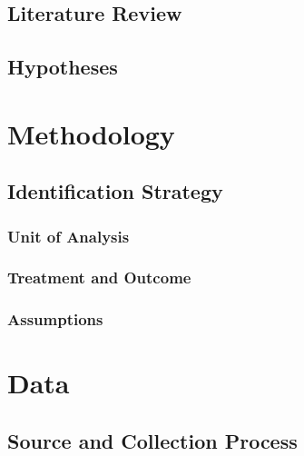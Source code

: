 \documentclass[a4paper,11pt]{article}
\begin{document}
\hypertarget{literature-review}{%
\subsection{Literature Review}\label{literature-review}}

\hypertarget{hypotheses}{%
\subsection{Hypotheses}\label{hypotheses}}

\newpage

\hypertarget{methodology}{%
\section{Methodology}\label{methodology}}

\hypertarget{identification-strategy}{%
\subsection{Identification Strategy}\label{identification-strategy}}

\hypertarget{unit-of-analysis}{%
\subsubsection{Unit of Analysis}\label{unit-of-analysis}}

\hypertarget{treatment-and-outcome}{%
\subsubsection{Treatment and Outcome}\label{treatment-and-outcome}}

\hypertarget{assumptions}{%
\subsubsection{Assumptions}\label{assumptions}}

\newpage

\hypertarget{data}{%
\section{Data}\label{data}}

\hypertarget{source-and-collection-process}{%
\subsection{Source and Collection Process}\label{source-and-collection-process}}
\end{document}
